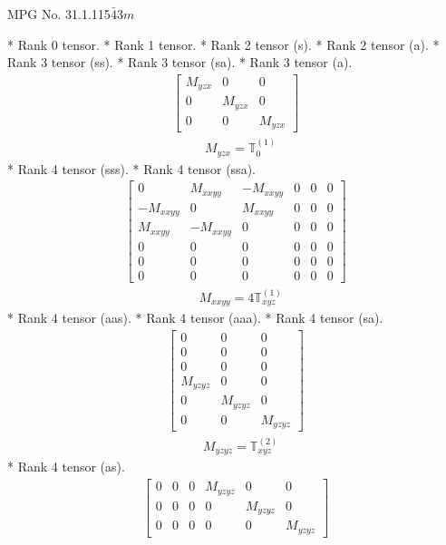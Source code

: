 \documentclass[fleqn,8pt,landscape]{jsarticle}
\begin{document}
\setcounter{MaxMatrixCols}{32}

\renewcommand{\tablename}{Table~}
\renewcommand{\figurename}{Figure~}
\begin{center}
\LARGE
MPG No. 31.1.115\quad$\bar{4}3m$
\end{center}
* Rank 0 tensor.
* Rank 1 tensor.
* Rank 2 tensor (s).
* Rank 2 tensor (a).
* Rank 3 tensor (ss).
* Rank 3 tensor (sa).
* Rank 3 tensor (a).
\begin{align*}
\begin{bmatrix} M_{yzx} & 0 & 0 \\ 0 & M_{yzx} & 0 \\ 0 & 0 & M_{yzx} \end{bmatrix}
\end{align*}
\begin{align*}
& M_{yzx} = \mathbb{T}_{0}^{(1)}
\end{align*}
* Rank 4 tensor (sss).
* Rank 4 tensor (ssa).
\begin{align*}
\begin{bmatrix} 0 & M_{xxyy} & - M_{xxyy} & 0 & 0 & 0 \\ - M_{xxyy} & 0 & M_{xxyy} & 0 & 0 & 0 \\ M_{xxyy} & - M_{xxyy} & 0 & 0 & 0 & 0 \\ 0 & 0 & 0 & 0 & 0 & 0 \\ 0 & 0 & 0 & 0 & 0 & 0 \\ 0 & 0 & 0 & 0 & 0 & 0 \end{bmatrix}
\end{align*}
\begin{align*}
& M_{xxyy} = 4 \mathbb{T}_{xyz}^{(1)}
\end{align*}
* Rank 4 tensor (aas).
* Rank 4 tensor (aaa).
* Rank 4 tensor (sa).
\begin{align*}
\begin{bmatrix} 0 & 0 & 0 \\ 0 & 0 & 0 \\ 0 & 0 & 0 \\ M_{yzyz} & 0 & 0 \\ 0 & M_{yzyz} & 0 \\ 0 & 0 & M_{yzyz} \end{bmatrix}
\end{align*}
\begin{align*}
& M_{yzyz} = \mathbb{T}_{xyz}^{(2)}
\end{align*}
* Rank 4 tensor (as).
\begin{align*}
\begin{bmatrix} 0 & 0 & 0 & M_{yzyz} & 0 & 0 \\ 0 & 0 & 0 & 0 & M_{yzyz} & 0 \\ 0 & 0 & 0 & 0 & 0 & M_{yzyz} \end{bmatrix}
\end{align*}
\end{document}
